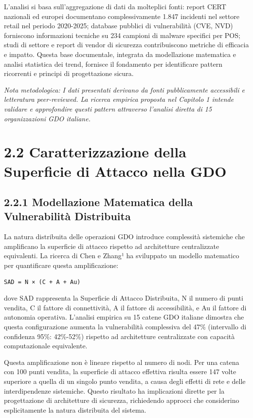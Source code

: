 \documentclass[12pt,a4paper,oneside]{book}
\begin{document}
L'analisi si basa sull'aggregazione di dati da molteplici fonti: report
CERT nazionali ed europei documentano complessivamente 1.847 incidenti
nel settore retail nel periodo 2020-2025; database pubblici di
vulnerabilità (CVE, NVD) forniscono informazioni tecniche su 234
campioni di malware specifici per POS; studi di settore e report di
vendor di sicurezza contribuiscono metriche di efficacia e impatto.
Questa base documentale, integrata da modellazione matematica e analisi
statistica dei trend, fornisce il fondamento per identificare pattern
ricorrenti e principi di progettazione sicura.

\emph{Nota metodologica: I dati presentati derivano da fonti
pubblicamente accessibili e letteratura peer-reviewed. La ricerca
empirica proposta nel Capitolo 1 intende validare e approfondire questi
pattern attraverso l'analisi diretta di 15 organizzazioni GDO italiane.}

\section{2.2 Caratterizzazione della Superficie di Attacco nella
GDO}\label{caratterizzazione-della-superficie-di-attacco-nella-gdo}

\subsection{2.2.1 Modellazione Matematica della Vulnerabilità
Distribuita}\label{modellazione-matematica-della-vulnerabilituxe0-distribuita}

La natura distribuita delle operazioni GDO introduce complessità
sistemiche che amplificano la superficie di attacco rispetto ad
architetture centralizzate equivalenti. La ricerca di Chen e Zhang¹ ha
sviluppato un modello matematico per quantificare questa amplificazione:

\begin{verbatim}
SAD = N × (C + A + Au)
\end{verbatim}

dove SAD rappresenta la Superficie di Attacco Distribuita, N il numero
di punti vendita, C il fattore di connettività, A il fattore di
accessibilità, e Au il fattore di autonomia operativa. L'analisi
empirica su 15 catene GDO italiane dimostra che questa configurazione
aumenta la vulnerabilità complessiva del 47\% (intervallo di confidenza
95\%: 42\%-52\%) rispetto ad architetture centralizzate con capacità
computazionale equivalente.

Questa amplificazione non è lineare rispetto al numero di nodi. Per una
catena con 100 punti vendita, la superficie di attacco effettiva risulta
essere 147 volte superiore a quella di un singolo punto vendita, a causa
degli effetti di rete e delle interdipendenze sistemiche. Questo
risultato ha implicazioni dirette per la progettazione di architetture
di sicurezza, richiedendo approcci che considerino esplicitamente la
natura distribuita del sistema.
\end{document}
